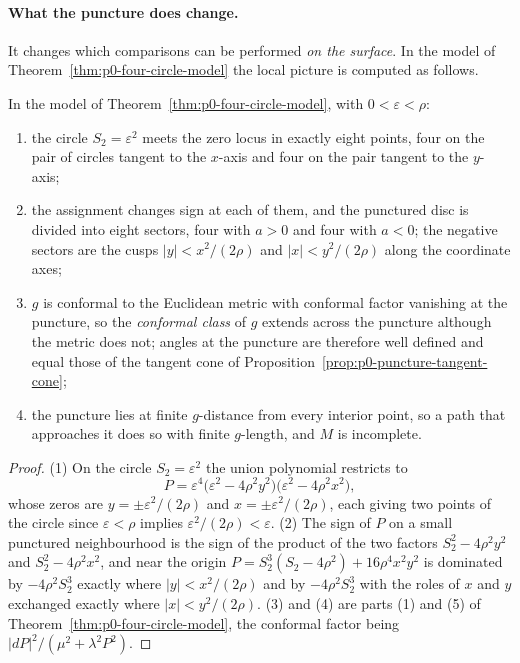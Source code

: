 \paragraph{What the puncture does change.}  It changes which comparisons can be
performed \emph{on the surface}.  In the model of
Theorem~\ref{thm:p0-four-circle-model} the local picture is computed as follows.

\begin{proposition}
\label{prop:p0-puncture-local-picture}
In the model of Theorem~\ref{thm:p0-four-circle-model}, with $0<\varepsilon<\rho$:
\begin{enumerate}
  \item the circle $S_2=\varepsilon^2$ meets the zero locus in exactly eight
  points, four on the pair of circles tangent to the $x$-axis and four on the
  pair tangent to the $y$-axis;
  \item the assignment changes sign at each of them, and the punctured disc is
  divided into eight sectors, four with $a>0$ and four with $a<0$; the negative
  sectors are the cusps $|y|<x^2/(2\rho)$ and $|x|<y^2/(2\rho)$ along the
  coordinate axes;
  \item $g$ is conformal to the Euclidean metric with conformal factor vanishing
  at the puncture, so the \emph{conformal class} of $g$ extends across the puncture
  although the metric does not; angles at the puncture are therefore well
  defined and equal those of the tangent cone of
  Proposition~\ref{prop:p0-puncture-tangent-cone};
  \item the puncture lies at finite $g$-distance from every interior point, so a
  path that approaches it does so with finite $g$-length, and $M$ is incomplete.
\end{enumerate}
\end{proposition}

\begin{proof}
(1) On the circle $S_2=\varepsilon^2$ the union polynomial restricts to
\[
  P=\varepsilon^4\bigl(\varepsilon^2-4\rho^2y^2\bigr)
              \bigl(\varepsilon^2-4\rho^2x^2\bigr),
\]
whose zeros are $y=\pm\varepsilon^2/(2\rho)$ and $x=\pm\varepsilon^2/(2\rho)$,
each giving two points of the circle since $\varepsilon<\rho$ implies
$\varepsilon^2/(2\rho)<\varepsilon$.  (2) The sign of $P$ on a small punctured
neighbourhood is the sign of the product of the two factors
$S_2^2-4\rho^2y^2$ and $S_2^2-4\rho^2x^2$, and near the origin
$P=S_2^3(S_2-4\rho^2)+16\rho^4x^2y^2$ is dominated by $-4\rho^2S_2^3$ exactly
where $|y|<x^2/(2\rho)$ and by $-4\rho^2S_2^3$ with the roles of $x$ and $y$
exchanged exactly where $|x|<y^2/(2\rho)$.  (3) and (4) are parts (1) and (5) of
Theorem~\ref{thm:p0-four-circle-model}, the conformal factor being
$|dP|^2/(\mu^2+\lambda^2P^2)$.
\end{proof}

